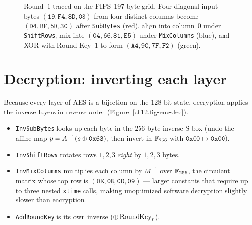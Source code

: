 \begin{figure}[htbp]
\caption{Round~$1$ traced on the FIPS~197 byte grid. Four diagonal input bytes $(\mathtt{19},\mathtt{F4},\mathtt{8D},\mathtt{08})$ from four distinct columns become $(\mathtt{D4},\mathtt{BF},\mathtt{5D},\mathtt{30})$ after \texttt{SubBytes} (red), align into column~$0$ under \texttt{ShiftRows}, mix into $(\mathtt{04},\mathtt{66},\mathtt{81},\mathtt{E5})$ under \texttt{MixColumns} (blue), and XOR with Round Key~$1$ to form $(\mathtt{A4},\mathtt{9C},\mathtt{7F},\mathtt{F2})$ (green).}
\label{ch12:round-fig}
\end{figure}

\section{Decryption: inverting each layer}

Because every layer of AES is a bijection on the $128$-bit state, decryption
applies the inverse layers in reverse order (Figure~\ref{ch12:fig-enc-dec}):
\begin{itemize}
  \item \texttt{InvSubBytes} looks up each byte in the $256$-byte inverse S-box
        (undo the affine map $y = A^{-1}(s \oplus \mathtt{0x63})$, then invert in
        $\mathbb{F}_{256}$ with $\mathtt{0x00} \mapsto \mathtt{0x00}$).
  \item \texttt{InvShiftRows} rotates rows $1,2,3$ \emph{right} by $1,2,3$ bytes.
  \item \texttt{InvMixColumns} multiplies each column by $M^{-1}$ over $\mathbb{F}_{256}$,
        the circulant matrix whose top row is
        $(\mathtt{0E},\mathtt{0B},\mathtt{0D},\mathtt{09})$ --- larger constants
        that require up to three nested \texttt{xtime} calls, making unoptimized
        software decryption slightly slower than encryption.
  \item \texttt{AddRoundKey} is its own inverse ($\oplus\,\text{RoundKey}_r$).
\end{itemize}

